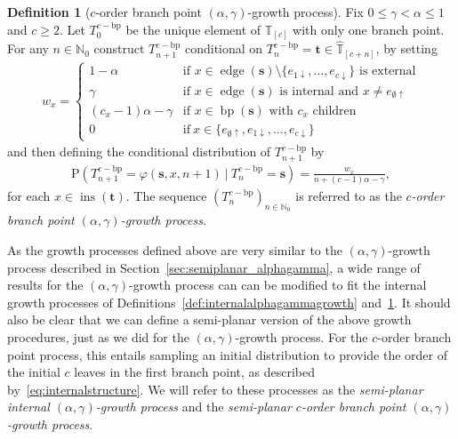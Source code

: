 \documentclass[a4paper, final]{amsart}
\theoremstyle{plain}
\theoremstyle{definition}
\newtheorem{defi}[thm]{Definition}
\newcommand{\tree}[1][t]{\boldsymbol{#1}}
\newcommand{\Thatspace}[1][\T]{\widehat{\boldsymbol{#1}}} %
\newcommand{\T}{\mathbb{T}}
\DeclareMathOperator{\edge}{edge}
\DeclareMathOperator{\insertable}{ins}
\DeclareMathOperator{\branchpoints}{bp}
\newcommand{\insertablef}[1][\tree]{\insertable({\tree[#1]})}
\renewcommand{\P}{\mathrm{P}}
\newcommand{\N}{\mathbb{N}}
\begin{document}
\begin{defi}[$c$-order branch point $(\alpha, \gamma)$-growth process]\label{def:branchpointalphagammagrowth}
  Fix $0 \leq \gamma < \alpha \leq 1$ and $c \geq 2$.
  Let $T_0^{c-\text{bp}}$ be the unique element of $\T_{[c]}$ with only one branch point.
  For any $n \in \N_0$ construct $T_{n+1}^{c-\text{bp}}$ conditional on $T_n^{c-\text{bp}} = \tree \in \Thatspace_{[c + n]}$, by setting
  \begin{align*}
    w_x
    = 
    \begin{cases}
      1 - \alpha & \text{if $x \in \edge \left( \tree[s] \right) \setminus \{e_{1\downarrow}, \ldots, e_{c\downarrow}\}$ is external} \\
      \gamma & \text{if $x \in \edge \left( \tree[s] \right)$ is internal and $x \neq e_{\emptyset \uparrow}$} \\
      \left( c_x - 1 \right) \alpha - \gamma & \text{if $x \in \branchpoints (\tree[s])$ with $c_x$ children} \\
      0 & \text{if}\ x \in \{e_{\emptyset \uparrow}, e_{1\downarrow}, \ldots, e_{c\downarrow}\}
    \end{cases}
  \end{align*}
  and then defining the conditional distribution of $T_{n+1}^{c-\text{bp}}$ by
  \begin{align*}
    \P \left( T_{n+1}^{c-\text{bp}} = \varphi \left( \tree[s], x, n+1 \right) \ \big \vert \ T_n^{c-\text{bp}} = \tree[s] \right)
    = \frac{w_x}{n + (c-1)\alpha - \gamma},
  \end{align*}
  for each $x \in \insertablef[t]$.
  The sequence ${\left( T_n^{c-\text{bp}} \right)}_{n \in \N_0}$ is referred to as the \textit{$c$-order branch point $(\alpha, \gamma)$-growth process}. 
\end{defi}
%
As the growth processes defined above are very similar to the $(\alpha, \gamma)$-growth process described in Section~\ref{sec:semiplanar_alphagamma}, a wide range of results for the $(\alpha, \gamma)$-growth process can can be modified to fit the internal growth processes of Definitions~\ref{def:internalalphagammagrowth} and~\ref{def:branchpointalphagammagrowth}.
It should also be clear that we can define a semi-planar version of the above growth procedures, just as we did for the $(\alpha, \gamma)$-growth process.
For the $c$-order branch point process, this entails sampling an initial distribution to provide the order of the initial $c$ leaves in the first branch point, as described by~\eqref{eq:internalstructure}.
We will refer to these processes as the \textit{semi-planar internal $(\alpha, \gamma)$-growth process} and the \textit{semi-planar $c$-order branch point $(\alpha, \gamma)$-growth process}.
\end{document}

